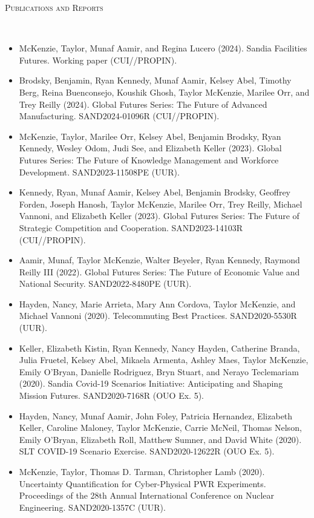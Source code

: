 \documentclass[11pt]{article}
\newenvironment{changemargin}[2]{%
  \begin{list}{}{%
    \setlength{\topsep}{0pt}%
    \setlength{\leftmargin}{#1}%
    \setlength{\rightmargin}{#2}%
    \setlength{\listparindent}{\parindent}%
    \setlength{\itemindent}{\parindent}%
    \setlength{\parsep}{\parskip}%
  }%
  \item[]}{\end{list}
}
\newcommand{\lineover}{
	\begin{changemargin}{-0.05in}{-0.05in}
		\vspace*{-8pt}
		\hrulefill \\
		\vspace*{-2pt}
	\end{changemargin}
}
\newcommand{\header}[1]{
	\begin{changemargin}{-0.5in}{-0.5in}
		\scshape{#1}\\
	\vspace*{-5pt}
  	\lineover
	\end{changemargin}
}
\newenvironment{body} {
	\vspace*{-16pt}
	\begin{changemargin}{-0.25in}{-0.5in}
  }	
	{\end{changemargin}
}
\begin{document}
\smallskip
\vspace*{-5pt}
\header{Publications and Reports}
\begin{body}
\vspace{14pt}
\begin{itemize}
	\item McKenzie, Taylor, Munaf Aamir, and Regina Lucero (2024). Sandia Facilities Futures. Working paper (CUI//PROPIN).
	\item Brodsky, Benjamin, Ryan Kennedy, Munaf Aamir, Kelsey Abel, Timothy Berg, Reina Buenconsejo, Koushik Ghosh, Taylor McKenzie, Marilee Orr, and Trey Reilly (2024). Global Futures Series: The Future of Advanced Manufacturing. SAND2024-01096R (CUI//PROPIN).
	\item McKenzie, Taylor, Marilee Orr, Kelsey Abel, Benjamin Brodsky, Ryan Kennedy, Wesley Odom, Judi See, and Elizabeth Keller (2023). Global Futures Series: The Future of Knowledge Management and Workforce Development. SAND2023-11508PE (UUR).
	\item Kennedy, Ryan, Munaf Aamir, Kelsey Abel, Benjamin Brodsky, Geoffrey Forden, Joseph Hanosh, Taylor McKenzie, Marilee Orr, Trey Reilly, Michael Vannoni, and Elizabeth Keller (2023). Global Futures Series: The Future of Strategic Competition and Cooperation. SAND2023-14103R (CUI//PROPIN).
	\item Aamir, Munaf, Taylor McKenzie, Walter Beyeler, Ryan Kennedy, Raymond Reilly III (2022). Global Futures Series: The Future of Economic Value and National Security. SAND2022-8480PE (UUR).
	\item Hayden, Nancy, Marie Arrieta, Mary Ann Cordova, Taylor McKenzie, and Michael Vannoni (2020). Telecommuting Best Practices. SAND2020-5530R (UUR).
	\item Keller, Elizabeth Kistin, Ryan Kennedy, Nancy Hayden, Catherine Branda, Julia Fruetel, Kelsey Abel, Mikaela Armenta, Ashley Maes, Taylor McKenzie, Emily O'Bryan, Danielle Rodriguez, Bryn Stuart, and Nerayo Teclemariam (2020). Sandia Covid-19 Scenarios Initiative: Anticipating and Shaping Mission Futures. SAND2020-7168R (OUO Ex. 5).
	\item Hayden, Nancy, Munaf Aamir, John Foley, Patricia Hernandez, Elizabeth Keller, Caroline Maloney, Taylor McKenzie, Carrie McNeil, Thomas Nelson, Emily O'Bryan, Elizabeth Roll, Matthew Sumner, and David White (2020). SLT COVID-19 Scenario Exercise. SAND2020-12622R (OUO Ex. 5).
	\item McKenzie, Taylor, Thomas D. Tarman, Christopher Lamb (2020). Uncertainty Quantification for Cyber-Physical PWR Experiments. Proceedings of the 28th Annual International Conference on Nuclear Engineering. SAND2020-1357C (UUR).

\end{itemize}
\end{body}
\end{document}
